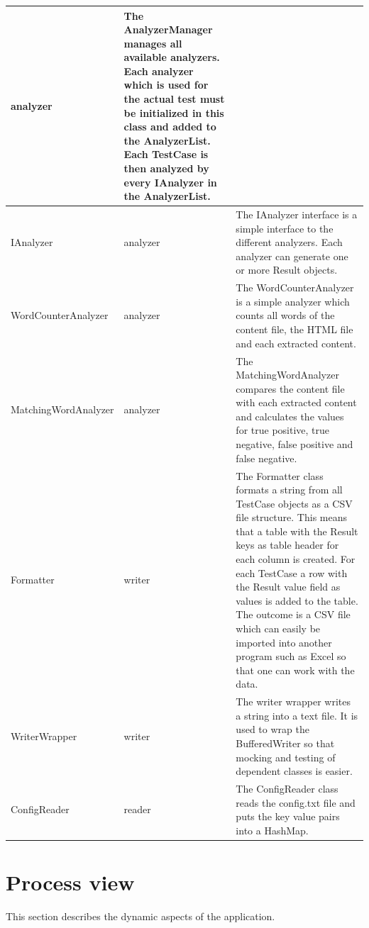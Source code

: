 \begin{longtable}{p{4cm}|p{2cm}|p{8cm}}
analyzer &          
The AnalyzerManager manages all available analyzers. Each analyzer which is used for the actual test must be initialized in this class and added to the AnalyzerList. Each TestCase is then analyzed by every IAnalyzer in the AnalyzerList.
\\ \hline
IAnalyzer &
analyzer &
The IAnalyzer interface is a simple interface to the different analyzers. Each analyzer can generate one or more Result objects.
\\ \hline
WordCounterAnalyzer &
analyzer &
The WordCounterAnalyzer is a simple analyzer which counts all words of the content file, the HTML file and each extracted content.
\\ \hline
MatchingWordAnalyzer &
analyzer &
The MatchingWordAnalyzer compares the content file with each extracted content and calculates the values for true positive, true negative, false positive and false negative.
\\ \hline
Formatter &           
writer &           
The Formatter class formats a string from all TestCase objects as a CSV file structure. This means that a table with the Result keys as table header for each column is created. For each TestCase a row with the Result value field as values is added to the table. The outcome is a CSV file which can easily be imported into another program such as Excel so that one can work with the data.
\\ \hline
WriterWrapper &
writer &
The writer wrapper writes a string into a text file. It is used to wrap the BufferedWriter so that mocking and testing of dependent classes is easier.
\\ \hline
ConfigReader &
reader &
The ConfigReader class reads the config.txt file and puts the key value pairs into a HashMap.
\\ \hline
\end{longtable}


\section{Process view}

This section describes the dynamic aspects of the application.

